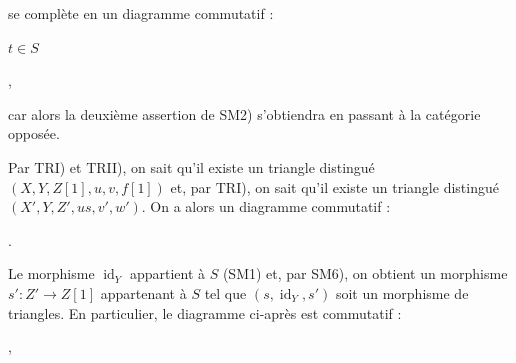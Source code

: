 \clearpage
{}%
\begingroup
\small
\setlength{\emergencystretch}{1.5em}%
\setlength{\abovedisplayskip}{2pt plus 1pt minus 1pt}%
\setlength{\belowdisplayskip}{2pt plus 1pt minus 1pt}%

\noindent se complète en un diagramme commutatif :

\begin{center}
  $t\in S$\qquad
  \quad ,
\end{center}

\noindent car alors la deuxième assertion de SM2) s'obtiendra en passant à
la catégorie opposée.

Par TRI) et TRII), on sait qu'il existe un triangle distingué
$(X,Y,Z[1],u,v,f[1])$ et, par TRI), on sait qu'il existe un triangle distingué
$(X',Y,Z',us,v',w')$. On a alors un diagramme commutatif :

\begin{center}
  \quad .
\end{center}

\noindent Le morphisme $\operatorname{id}_Y$ appartient à $S$ (SM1) et, par
SM6), on obtient un morphisme $s'\colon Z'\to Z[1]$ appartenant à $S$ tel que
$(s,\operatorname{id}_Y,s')$ soit un morphisme de triangles. En particulier,
le diagramme ci-après est commutatif :

\begin{center}
  \quad ,
\end{center}

